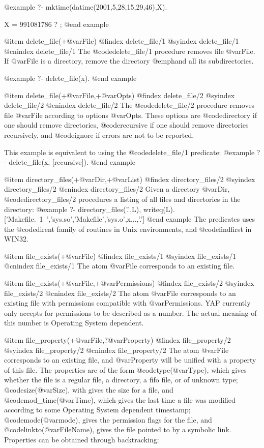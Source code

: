 {{{{{{{{@example
   ?- mktime(datime(2001,5,28,15,29,46),X).

X = 991081786 ? ;
@end example

@item delete_file(+@var{File})
@findex  delete_file/1
@syindex delete_file/1
@cnindex delete_file/1
The @code{delete_file/1} procedure removes file @var{File}. If
@var{File} is a directory, remove the directory @emph{and all its
subdirectories}.

@example
   ?- delete_file(x).
@end example

@item delete_file(+@var{File},+@var{Opts})
@findex  delete_file/2
@syindex delete_file/2
@cnindex delete_file/2
The @code{delete_file/2} procedure removes file @var{File} according to
options @var{Opts}. These options are @code{directory} if one should
remove directories, @code{recursive} if one should remove directories
recursively, and @code{ignore} if errors are not to be reported.

This example is equivalent to using the @code{delete_file/1} predicate:
@example
   ?- delete_file(x, [recursive]).
@end example


@item directory_files(+@var{Dir},+@var{List})
@findex  directory_files/2
@syindex directory_files/2
@cnindex directory_files/2
Given a directory @var{Dir},  @code{directory_files/2} procedures a
listing of all files and directories in the directory:
@example
    ?- directory_files('.',L), writeq(L).
['Makefile.~1~','sys.so','Makefile','sys.o',x,..,'.']
@end example
The predicates uses the @code{dirent} family of routines in Unix
environments, and @code{findfirst} in WIN32.

@item file_exists(+@var{File})
@findex  file_exists/1
@syindex file_exists/1
@cnindex file_exists/1
The atom @var{File} corresponds to an existing file.

@item file_exists(+@var{File},+@var{Permissions})
@findex  file_exists/2
@syindex file_exists/2
@cnindex file_exists/2
The atom @var{File} corresponds to an existing file with permissions
compatible with @var{Permissions}. YAP currently only accepts for
permissions to be described as a number. The actual meaning of this
number is Operating System dependent.

@item file_property(+@var{File},?@var{Property})
@findex  file_property/2
@syindex file_property/2
@cnindex file_property/2
The atom @var{File} corresponds to an existing file, and @var{Property}
will be unified with a property of this file. The properties are of the
form @code{type(@var{Type})}, which gives whether the file is a regular
file, a directory, a fifo file, or of unknown type;
@code{size(@var{Size})}, with gives the size for a file, and
@code{mod_time(@var{Time})}, which gives the last time a file was
modified according to some Operating System dependent
timestamp; @code{mode(@var{mode})}, gives the permission flags for the
file, and @code{linkto(@var{FileName})}, gives the file pointed to by a
symbolic link. Properties can be obtained through backtracking:

}}}}}}}}
